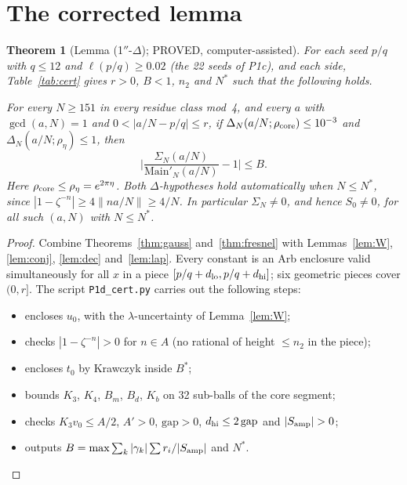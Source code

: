 \documentclass[11pt]{article}
\newtheorem{theorem}{Theorem}\newtheorem{lemma}[theorem]{Lemma}\newtheorem{proposition}[theorem]{Proposition}
\theoremstyle{definition}\newtheorem{definition}[theorem]{Definition}
\theoremstyle{remark}\newtheorem{remark}[theorem]{Remark}
\begin{document}
\section{The corrected lemma}
\begin{theorem}[Lemma (1$''$-$\Delta$); PROVED, computer-assisted]\label{thm:main}
For each seed $p/q$ with $q\le12$ and $\ell(p/q)\ge0.02$ (the 22 seeds of P1c), and each side, Table~\ref{tab:cert} gives $r>0$, $B<1$, $n_2$ and $N^*$ such that the following holds.

For every $N\ge151$ in every residue class mod~4, and every $a$ with $\gcd(a,N)=1$ and $0<|a/N-p/q|\le r$, if $\Delta_N(a/N;\rho_{\rm core})\le10^{-3}$ and $\Delta_N(a/N;\rho_\eta)\le1$, then
\[\Big|\frac{\Sigma_N(a/N)}{\mathrm{Main}'_N(a/N)}-1\Big|\le B.\]
Here $\rho_{\rm core}\le\rho_\eta=e^{2\pi\eta}$.
Both $\Delta$-hypotheses hold automatically when $N\le N^*$, since $|1-\zeta^{-n}|\ge4\|na/N\|\ge4/N$.
In particular $\Sigma_N\ne0$, and hence $S_0\ne0$, for all such $(a,N)$ with $N\le N^*$.
\end{theorem}
\begin{proof}
Combine Theorems~\ref{thm:gauss} and~\ref{thm:fresnel} with Lemmas~\ref{lem:W}, \ref{lem:conj}, \ref{lem:dec} and~\ref{lem:lap}.
Every constant is an Arb enclosure valid simultaneously for all $x$ in a piece $[p/q+d_{\rm lo},p/q+d_{\rm hi}]$; six geometric pieces cover $(0,r]$.
The script \texttt{P1d\_cert.py} carries out the following steps:
\begin{itemize}
\item encloses $u_0$, with the $\lambda$-uncertainty of Lemma~\ref{lem:W};
\item checks $|1-\zeta^{-n}|>0$ for $n\in A$ (no rational of height $\le n_2$ in the piece);
\item encloses $t_0$ by Krawczyk inside $B^*$;
\item bounds $K_3$, $K_4$, $B_m$, $B_d$, $K_b$ on 32 sub-balls of the core segment;
\item checks $K_3v_0\le A/2$, $A'>0$, $\mathrm{gap}>0$, $d_{\rm hi}\le2\,\mathrm{gap}$ and $|S_{\rm amp}|>0$;
\item outputs $B=\max\sum_k|\gamma_k|\sum r_i/|S_{\rm amp}|$ and $N^*$.
\end{itemize}
\end{proof}
\end{document}
